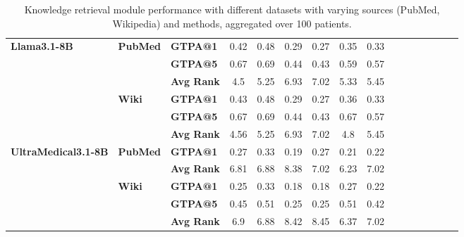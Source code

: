\begin{table}[t]
{\begin{tabular}{lllccccccccccccc}
    \midrule
    \multirow{4}{*}{\textbf{Llama3.1-8B}} 
    & \multirow{2}{*}{\textbf{PubMed}} 
    & \textbf{GTPA@1} & 0.42 & 0.48 & 0.29 & 0.27 & 0.35 & 0.33 \\
    & & \textbf{GTPA@5} & 0.67 & 0.69 & 0.44 & 0.43 & 0.59 & 0.57 \\
    & & \textbf{Avg Rank} & 4.5 & 5.25 & 6.93 & 7.02 & 5.33 & 5.45 \\
    \cmidrule{2-9}
    & \multirow{2}{*}{\textbf{Wiki}} 
    & \textbf{GTPA@1} & 0.43 & 0.48 & 0.29 & 0.27 & 0.36 & 0.33 \\
    & & \textbf{GTPA@5} & 0.67 & 0.69 & 0.44 & 0.43 & 0.67 & 0.57 \\
    & & \textbf{Avg Rank} & 4.56 & 5.25 & 6.93 & 7.02 & 4.8 & 5.45 \\
    \midrule
    \multirow{4}{*}{\textbf{UltraMedical3.1-8B}} 
    & \multirow{2}{*}{\textbf{PubMed}} 
    & \textbf{GTPA@1} & 0.27 & 0.33 & 0.19 & 0.27 & 0.21 & 0.22 \\
    & & \textbf{Avg Rank} & 6.81 & 6.88 & 8.38 & 7.02 & 6.23 & 7.02 \\
    \cmidrule{2-9}
    & \multirow{2}{*}{\textbf{Wiki}} 
    & \textbf{GTPA@1} & 0.25 & 0.33 & 0.18 & 0.18 & 0.27 & 0.22 \\
    & & \textbf{GTPA@5} & 0.45 & 0.51 & 0.25 & 0.25 & 0.51 & 0.42 \\
    & & \textbf{Avg Rank} & 6.9 & 6.88 & 8.42 & 8.45 & 6.37 & 7.02 \\
    \bottomrule
    \end{tabular}%
    }
    \caption{Knowledge retrieval module performance with different datasets with varying sources (PubMed, Wikipedia) and methods, aggregated over 100 patients. }
    \label{tab:performance_rag}
\end{table}